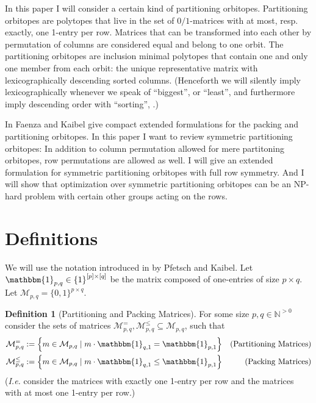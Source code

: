 \documentclass[a4paper]{amsart}
\theoremstyle{definition}
\newtheorem{defn}[theorem]{Definition}
\theoremstyle{remark}
\def\Ie{\emph{I.e.}}
\newcommand\mpar[1]{\marginpar {\flushleft\sffamily\small #1}}
\newcommand{\todo}[1]{\mpar{#1}}
\newcommand{\lrE}[1]{\ensuremath{\left[ #1 \right]}}
\newcommand{\lrM}[1]{\ensuremath{\left\{ #1 \right\}}}
\newcommand{\naturals}{\ensuremath{\mathbb{N}}}
\newcommand{\M}{\ensuremath{\mathcal{M}}}
\begin{document}
In this paper I will consider a certain kind of partitioning
orbitopes.  Partitioning orbitopes are polytopes that live in the set
of \(0/1\)-matrices with at most, resp. exactly, one 1-entry per row.
Matrices that can be transformed into each other by permutation of
columns are considered equal and belong to one orbit.  The
partitioning orbitopes are inclusion minimal polytopes that contain
one and only one member from each orbit: the unique representative
matrix with lexicographically descending sorted columns.  (Henceforth
we will silently imply lexicographically whenever we speak of
``biggest'', or ``least'', and furthermore imply descending order with
``sorting'', .)

In \cite{faenza-2008} Faenza and Kaibel give compact extended
formulations for the packing and partitioning orbitopes.  In this
paper I want to review symmetric partitioning orbitopes: In addition
to column permutation allowed for mere partitoning orbitopes, row
permutations are allowed as well.  I will give an extended formulation
for symmetric partitioning orbitopes with full row symmetry. And I
will show that optimization over symmetric partitioning orbitopes can
be an NP-hard problem \todo{or NP complete?} with certain other groups
acting on the rows.



\section{Definitions}
We will use the notation introduced in \cite{orbi} by Pfetsch
and Kaibel.  Let \(\mathbbm{1}_{p,q} \in \lrM{1}^{\lrE{p}
  \times \lrE{q}}\) be the matrix composed of one-entries of size \(p \times q\).
Let \(\M_{p,q} = \{0, 1\}^{p \times q} \). 

\begin{defn}[Partitioning and Packing Matrices]
  For some size \(p, q \in \naturals^{>0}\) consider the sets of
  matrices \(\M_{p,q}^{=},\M_{p,q}^{\leq} \subseteq \M_{p, q}\), such
  that 
  \begin{align}
    \M_{p,q}^{=} & := \lrM{m \in \M_{p,q} \mid m \cdot \mathbbm{1}_{q, 1} = \mathbbm{1}_{p, 1}} & \text{(Partitioning Matrices)}\\
    \M_{p,q}^{\leq} & := \lrM{m \in \M_{p,q} \mid m \cdot \mathbbm{1}_{q, 1} \leq \mathbbm{1}_{p, 1}} & \text{(Packing Matrices)}
  \end{align}
  (\Ie{} consider the matrices with exactly one 1-entry per row and the matrices with at most one 1-entry per row.)
\end{defn}
\end{document}
